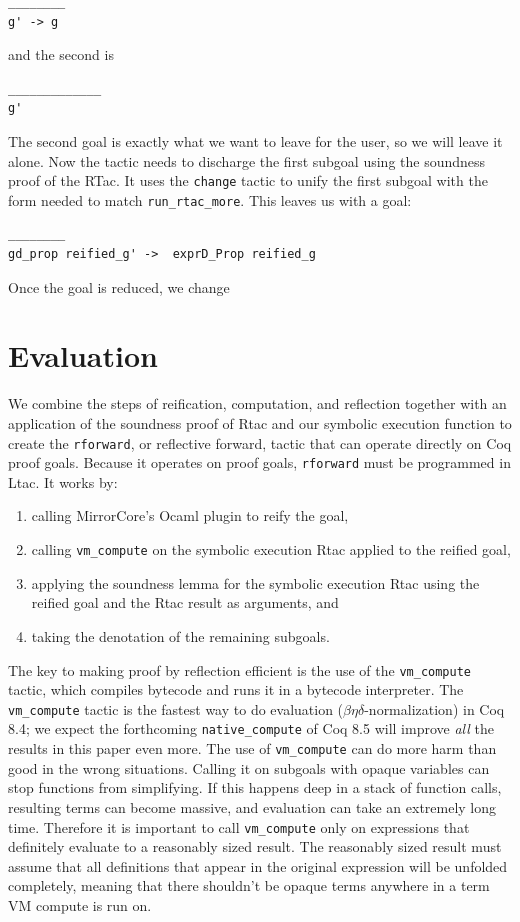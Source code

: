 \documentclass{puthesis}
\begin{document}
\begin{lstlisting}
________
g' -> g
\end{lstlisting}

and the second is
\begin{lstlisting}
_____________
g'
\end{lstlisting}

The second goal is exactly what we want to leave for the user, so we
will leave it alone. Now the tactic needs to discharge the first
subgoal using the soundness proof of the RTac. It uses the
\lstinline|change| tactic to unify the first subgoal with the form
needed to match \lstinline|run_rtac_more|. This leaves us with a goal:

\begin{lstlisting}
________
gd_prop reified_g' ->  exprD_Prop reified_g
\end{lstlisting}




Once the goal is reduced, we change 


\chapter{Evaluation}
\label{ch:evaluation}
We combine the steps of reification, computation, and reflection
together with an application of the soundness proof of Rtac and our
symbolic execution function to create the \lstinline|rforward|, or
reflective forward, tactic that can operate directly on Coq proof
goals. Because it operates on proof goals, \lstinline|rforward| must
be programmed in Ltac.  It works by:
\begin{enumerate}
\item calling MirrorCore's Ocaml plugin to reify the goal,
\item calling \lstinline|vm_compute| on the symbolic execution Rtac
  applied to the reified goal,
\item applying the soundness lemma for the symbolic execution Rtac
  using the reified goal and the Rtac result as arguments, and
\item taking the denotation of the remaining subgoals.
\end{enumerate}
The key to making proof by reflection efficient is the use of the
\lstinline|vm_compute| tactic, which compiles bytecode and runs it in
a bytecode interpreter. The \lstinline|vm_compute| tactic is the
fastest way to do evaluation ($\beta\eta\delta$-normalization) in Coq
8.4; we expect the forthcoming \lstinline{native_compute} of Coq 8.5
will improve \emph{all} the results in this paper even more.  The use
of \lstinline|vm_compute| can do more harm than good in the wrong
situations. Calling it on subgoals with opaque variables can stop
functions from simplifying. If this happens deep in a stack of
function calls, resulting terms can become massive, and evaluation can
take an extremely long time. Therefore it is important to call
\lstinline|vm_compute| only on expressions that definitely evaluate to
a reasonably sized result. The reasonably sized result must assume
that all definitions that appear in the original expression will be
unfolded completely, meaning that there shouldn't be opaque terms
anywhere in a term VM compute is run on.
  
\end{document}
